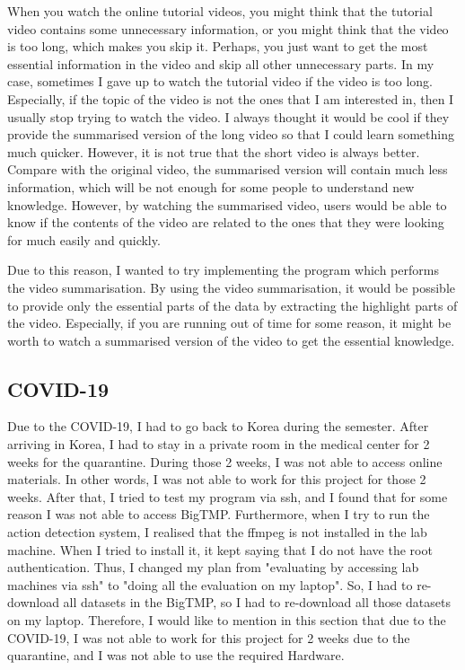 \documentclass{article}
\begin{document}
When you watch the online tutorial videos, you might think that the tutorial video contains some unnecessary information, or you might think that the video is too long, which makes you skip it. Perhaps, you just want to get the most essential information in the video and skip all other unnecessary parts. In my case, sometimes I gave up to watch the tutorial video if the video is too long. Especially, if the topic of the video is not the ones that I am interested in, then I usually stop trying to watch the video. I always thought it would be cool if they provide the summarised version of the long video so that I could learn something much quicker. However, it is not true that the short video is always better. Compare with the original video, the summarised version will contain much less information, which will be not enough for some people to understand new knowledge. However, by watching the summarised video, users would be able to know if the contents of the video are related to the ones that they were looking for much easily and quickly.

Due to this reason, I wanted to try implementing the program which performs the video summarisation. By using the video summarisation, it would be possible to provide only the essential parts of the data by extracting the highlight parts of the video. Especially, if you are running out of time for some reason, it might be worth to watch a summarised version of the video to get the essential knowledge.

\subsection{COVID-19}

Due to the COVID-19, I had to go back to Korea during the semester. After arriving in Korea, I had to stay in a private room in the medical center for 2 weeks for the quarantine. During those 2 weeks, I was not able to access online materials. In other words, I was not able to work for this project for those 2 weeks. After that, I tried to test my program via ssh, and I found that for some reason I was not able to access BigTMP. Furthermore, when I try to run the action detection system, I realised that the ffmpeg is not installed in the lab machine. When I tried to install it, it kept saying that I do not have the root authentication. Thus, I changed my plan from "evaluating by accessing lab machines via ssh" to "doing all the evaluation on my laptop". So, I had to re-download all datasets in the BigTMP, so I had to re-download all those datasets on my laptop. Therefore, I would like to mention in this section that due to the COVID-19, I was not able to work for this project for 2 weeks due to the quarantine, and I was not able to use the required Hardware.
\end{document}
